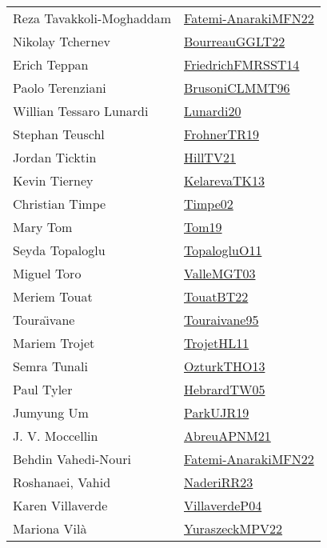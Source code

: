 {\begin{longtable}{p{4cm}p{20cm}}
Reza Tavakkoli-Moghaddam & \href{}{Fatemi-AnarakiMFN22}\cite{Fatemi-AnarakiMFN22} \\
Nikolay Tchernev & \href{articles/BourreauGGLT22.pdf}{BourreauGGLT22}\cite{BourreauGGLT22} \\
Erich Teppan & \href{}{FriedrichFMRSST14}\cite{FriedrichFMRSST14} \\
Paolo Terenziani & \href{papers/BrusoniCLMMT96.pdf}{BrusoniCLMMT96}\cite{BrusoniCLMMT96} \\
Willian Tessaro Lunardi & \href{}{Lunardi20}\cite{Lunardi20} \\
Stephan Teuschl & \href{papers/FrohnerTR19.pdf}{FrohnerTR19}\cite{FrohnerTR19} \\
Jordan Ticktin & \href{papers/HillTV21.pdf}{HillTV21}\cite{HillTV21} \\
Kevin Tierney & \href{papers/KelarevaTK13.pdf}{KelarevaTK13}\cite{KelarevaTK13} \\
Christian Timpe & \href{articles/Timpe02.pdf}{Timpe02}\cite{Timpe02} \\
Mary Tom & \href{papers/Tom19.pdf}{Tom19}\cite{Tom19} \\
Seyda Topaloglu & \href{articles/TopalogluO11.pdf}{TopalogluO11}\cite{TopalogluO11} \\
Miguel Toro & \href{papers/ValleMGT03.pdf}{ValleMGT03}\cite{ValleMGT03} \\
Meriem Touat & \href{papers/TouatBT22.pdf}{TouatBT22}\cite{TouatBT22} \\
Toura{\"{\i}}vane & \href{papers/Touraivane95.pdf}{Touraivane95}\cite{Touraivane95} \\
Mariem Trojet & \href{articles/TrojetHL11.pdf}{TrojetHL11}\cite{TrojetHL11} \\
Semra Tunali & \href{articles/OzturkTHO13.pdf}{OzturkTHO13}\cite{OzturkTHO13} \\
Paul Tyler & \href{papers/HebrardTW05.pdf}{HebrardTW05}\cite{HebrardTW05} \\
Jumyung Um & \href{papers/ParkUJR19.pdf}{ParkUJR19}\cite{ParkUJR19} \\
J. V. Moccellin & \href{}{AbreuAPNM21}\cite{AbreuAPNM21} \\
Behdin Vahedi-Nouri & \href{}{Fatemi-AnarakiMFN22}\cite{Fatemi-AnarakiMFN22} \\
Roshanaei, Vahid & \href{articles/NaderiRR23.pdf}{NaderiRR23}\cite{NaderiRR23} \\
Karen Villaverde & \href{}{VillaverdeP04}\cite{VillaverdeP04} \\
Mariona Vil{\`a} & \href{articles/YuraszeckMPV22.pdf}{YuraszeckMPV22}\cite{YuraszeckMPV22} \\

\end{longtable}}
